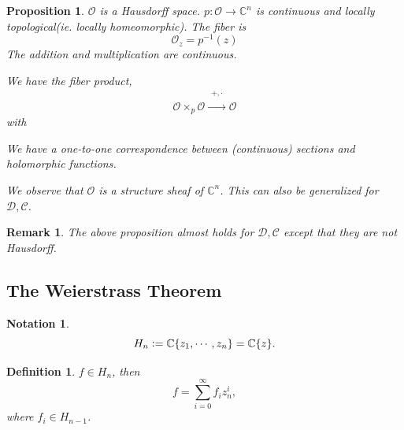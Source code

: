 \documentclass{article}
\newtheorem{proposition}{Proposition}[section]
\newtheorem{definition}{Definition}[section]
\newtheorem{notation}{Notation}[section]
\newtheorem{remark}{Remark}[section]
\newcommand{\defeq}{\vcentcolon=}
\newcommand{\C}[0]{\mathbb{C}}
\begin{document}
\begin{proposition}
  $\mathcal{O}$ is a Hausdorff space. $p:\mathcal{O}\to\C^n$ is continuous and locally topological(ie. locally homeomorphic). The fiber is
  \begin{equation*}
    \mathcal{O}_z = p^{-1}(z)
  \end{equation*}
  The addition and multiplication are continuous. 
  \par We have the fiber product,
  \begin{equation*}
    \mathcal{O}\times_p\mathcal{O}\stackrel{\substack{+,\cdot\\\:}}{\to}\mathcal{O}
  \end{equation*}
  with 
  \begin{center}
  \end{center}
  We have a one-to-one correspondence between (continuous) sections and holomorphic functions.
  \par We observe that $\mathcal{O}$ is a structure sheaf of $\C^n$. This can also be generalized for $\mathcal{D},\mathcal{C}$.
\end{proposition}

\begin{remark}
  The above proposition almost holds for $\mathcal{D},\mathcal{C}$ except that they are not Hausdorff.
\end{remark}

\subsection{The Weierstrass Theorem}

\begin{notation}
  \begin{equation*}
    H_n \defeq \C\{z_1,\cdots,z_n\} = \C\{z\}.
  \end{equation*}
\end{notation}

\begin{definition}
  $f\in H_n$, then 
  \begin{equation*}
    f = \sum_{i = 0}^\infty f_iz_n^i,
  \end{equation*}
  where $f_i\in H_{n-1}$. 
\end{definition}
\end{document}
